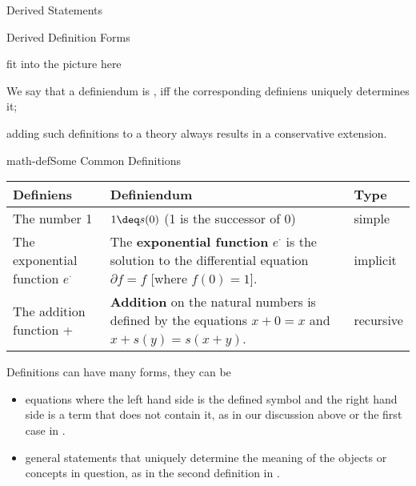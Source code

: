 
\begin{omgroup}{Derived Statements}

\begin{module}[id=derived-defs]
\begin{omgroup}[short=Derived Definitions]{Derived Definition Forms}

\begin{oldpart}{fit into the picture here}
\begin{definition}[display=flow,id=well-defined.def]
  We say that a definiendum is {}, iff the corresponding definiens
  uniquely determines it;
\end{definition}
adding such definitions to a theory always results in a conservative extension.

\begin{myfig}{math-def}{Some Common Definitions}\small
 \begin{tabular}{|p{2.2cm}|p{7cm}|l|}\hline
   Definiens & Definiendum & Type \\\hline\hline
   The number 1 & $1\deq s(0)$ (1 is the successor of 0) & simple\\\hline
   The exponential function $e^\cdot$ 
         &  The {\textbf{exponential function}} $e^\cdot$ is the solution to the
   differential equation $\partial f=f$ [where $f(0)=1$]. & implicit\\\hline
   The addition function + & {\textbf{Addition}} on the natural numbers is defined by the equations
   $x+0=x$ and $x+s(y)=s(x+y)$. & recursive\\\hline
 \end{tabular}
\end{myfig}

\begin{omtext}
  Definitions can have many forms, they can be
\begin{itemize}
\item equations where the left hand side is the defined symbol and the right hand side is
  a term that does not contain it, as in our discussion above or the first case in
  {}. 
\item general statements that uniquely determine the meaning of the objects or concepts in
  question, as in the second definition in {}. 
  

\end{itemize}
\end{omtext}
\end{oldpart}
\end{omgroup}
\end{module}
\end{omgroup}
